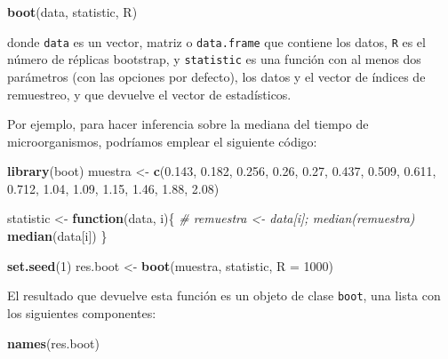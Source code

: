\documentclass[]{book}
\newenvironment{Shaded}{\begin{snugshade}}{\end{snugshade}}
\newcommand{\KeywordTok}[1]{\textcolor[rgb]{0.13,0.29,0.53}{\textbf{#1}}}
\newcommand{\DataTypeTok}[1]{\textcolor[rgb]{0.13,0.29,0.53}{#1}}
\newcommand{\DecValTok}[1]{\textcolor[rgb]{0.00,0.00,0.81}{#1}}
\newcommand{\FloatTok}[1]{\textcolor[rgb]{0.00,0.00,0.81}{#1}}
\newcommand{\StringTok}[1]{\textcolor[rgb]{0.31,0.60,0.02}{#1}}
\newcommand{\CommentTok}[1]{\textcolor[rgb]{0.56,0.35,0.01}{\textit{#1}}}
\newcommand{\ControlFlowTok}[1]{\textcolor[rgb]{0.13,0.29,0.53}{\textbf{#1}}}
\newcommand{\NormalTok}[1]{#1}
\theoremstyle{definition}
\theoremstyle{definition}
\theoremstyle{definition}
\theoremstyle{remark}
\begin{document}
\begin{Shaded}
\begin{Highlighting}[]
\KeywordTok{boot}\NormalTok{(data, statistic, R)}
\end{Highlighting}
\end{Shaded}

donde \texttt{data} es un vector, matriz o \texttt{data.frame} que
contiene los datos, \texttt{R} es el número de réplicas bootstrap, y
\texttt{statistic} es una función con al menos dos parámetros (con las
opciones por defecto), los datos y el vector de índices de remuestreo, y
que devuelve el vector de estadísticos.

Por ejemplo, para hacer inferencia sobre la mediana del tiempo de
microorganismos, podríamos emplear el siguiente código:

\begin{Shaded}
\begin{Highlighting}[]
\KeywordTok{library}\NormalTok{(boot)}
\NormalTok{muestra <-}\StringTok{ }\KeywordTok{c}\NormalTok{(}\FloatTok{0.143}\NormalTok{, }\FloatTok{0.182}\NormalTok{, }\FloatTok{0.256}\NormalTok{, }\FloatTok{0.26}\NormalTok{, }\FloatTok{0.27}\NormalTok{, }\FloatTok{0.437}\NormalTok{, }\FloatTok{0.509}\NormalTok{, }
             \FloatTok{0.611}\NormalTok{, }\FloatTok{0.712}\NormalTok{, }\FloatTok{1.04}\NormalTok{, }\FloatTok{1.09}\NormalTok{, }\FloatTok{1.15}\NormalTok{, }\FloatTok{1.46}\NormalTok{, }\FloatTok{1.88}\NormalTok{, }\FloatTok{2.08}\NormalTok{)}

\NormalTok{statistic <-}\StringTok{ }\ControlFlowTok{function}\NormalTok{(data, i)\{}
  \CommentTok{# remuestra <- data[i]; median(remuestra)}
  \KeywordTok{median}\NormalTok{(data[i])}
\NormalTok{\}}

\KeywordTok{set.seed}\NormalTok{(}\DecValTok{1}\NormalTok{)}
\NormalTok{res.boot <-}\StringTok{ }\KeywordTok{boot}\NormalTok{(muestra, statistic, }\DataTypeTok{R =} \DecValTok{1000}\NormalTok{)}
\end{Highlighting}
\end{Shaded}

El resultado que devuelve esta función es un objeto de clase
\texttt{boot}, una lista con los siguientes componentes:

\begin{Shaded}
\begin{Highlighting}[]
\KeywordTok{names}\NormalTok{(res.boot)}
\end{Highlighting}
\end{Shaded}
\end{document}
